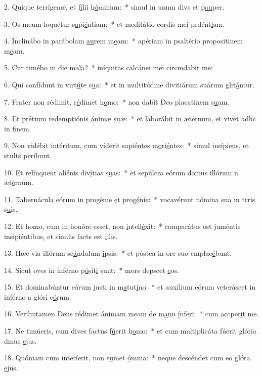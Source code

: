 2. Quique terrígenæ, et f\uline{í}lii h\uline{ó}minum:~* simul in unum divs et p\uline{au}per.\par 
3. Os meum loquétur s\uline{a}pi\uline{é}ntiam:~* et meditátio cordis mei prdént\uline{i}am.\par 
4. Inclinábo in parábolam \uline{au}rem m\uline{e}am:~* apériam in psaltério propositinem m\uline{e}am.\par 
5. Cur timébo in d\uline{i}e m\uline{a}la?~* iníquitas calcánei mei circmdab\uline{i}t me:\par 
6. Qui confídunt in virt\uline{ú}te s\uline{u}a:~* et in multitúdine divitiárum suárum glri\uline{á}ntur.\par 
7. Frater non rédimit, r\uline{é}dimet h\uline{o}mo:~* non dabit Deo placatinem s\uline{u}am.\par 
8. Et prétium redemptiónis \uline{á}nimæ s\uline{u}æ:~* et laborábit in ætérnum, et vivet adhc in f\uline{i}nem.\par 
9. Non vidébit intéritum, cum víderit sapiéntes m\uline{o}ri\uline{é}ntes:~* simul insípiens, et stults per\uline{í}bunt.\par 
10. Et relínquent aliénis div\uline{í}tias s\uline{u}as:~* et sepúlcra eórum domus illórum n æt\uline{é}rnum.\par 
11. Tabernácula eórum in progénie \uline{e}t prog\uline{é}nie:~* vocavérunt nómina sua in trris s\uline{u}is.\par 
12. Et homo, cum in honóre esset, non \uline{i}ntell\uline{é}xit:~* comparátus est juméntis insipiéntibus, et símilis facts est \uline{i}llis.\par 
13. Hæc via illórum sc\uline{á}ndalum \uline{i}psis:~* et póstea in ore suo cmplac\uline{é}bunt.\par 
14. Sicut oves in inférno p\uline{ó}sit\uline{i} sunt:~* mors depscet \uline{e}os.\par 
15. Et dominabúntur eórum justi in m\uline{a}tut\uline{í}no:~* et auxílium eórum veteráscet in inférno a glóri e\uline{ó}rum.\par 
16. Verúmtamen Deus rédimet ánimam meam de m\uline{a}nu \uline{í}nferi:~* cum accper\uline{i}t me.\par 
17. Ne timúeris, cum dives factus f\uline{ú}erit h\uline{o}mo:~* et cum multiplicáta fúerit glória dmus \uline{e}jus.\par 
18. Quóniam cum interíerit, non s\uline{u}met \uline{ó}mnia:~* neque descéndet cum eo glóra \uline{e}jus.\par 
